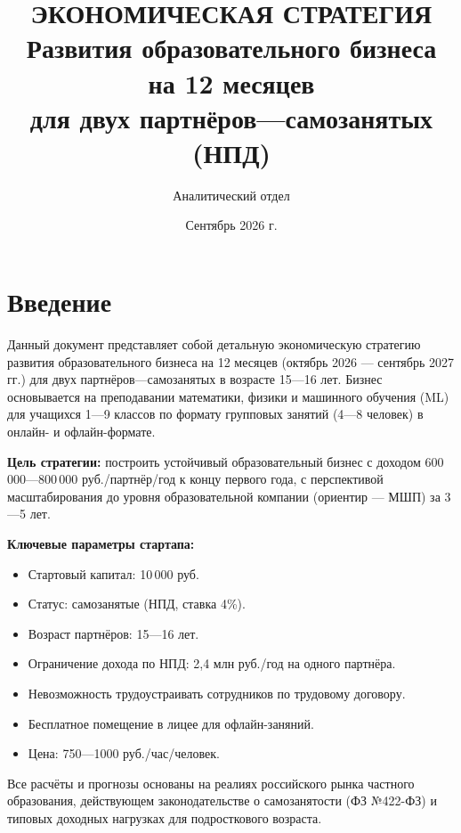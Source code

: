 \documentclass[12pt,a4paper]{article}
\title{
  \textbf{ЭКОНОМИЧЕСКАЯ СТРАТЕГИЯ} \\
  \vspace{0.3cm}
  \textbf{Развития образовательного бизнеса} \\
  \vspace{0.3cm}
  \textbf{на 12 месяцев} \\
  \vspace{0.3cm}
  \large
  для двух партнёров---самозанятых (НПД) \\
  \vspace{0.5cm}
}
\author{Аналитический отдел}
\date{Сентябрь 2026 г.}
\begin{document}
\maketitle

\newpage
\tableofcontents
\newpage

\section*{Введение}

Данный документ представляет собой детальную экономическую стратегию развития образовательного бизнеса на 12 месяцев (октябрь 2026 --- сентябрь 2027 гг.) для двух партнёров---самозанятых в возрасте 15---16 лет. Бизнес основывается на преподавании математики, физики и машинного обучения (ML) для учащихся 1---9 классов по формату групповых занятий (4---8 человек) в онлайн- и офлайн-формате.

\textbf{Цель стратегии:} построить устойчивый образовательный бизнес с доходом 600\,000---800\,000 руб./партнёр/год к концу первого года, с перспективой масштабирования до уровня образовательной компании (ориентир --- МШП) за 3---5 лет.

\textbf{Ключевые параметры стартапа:}

\begin{itemize}
  \item Стартовый капитал: 10\,000 руб.
  \item Статус: самозанятые (НПД, ставка 4\%).
  \item Возраст партнёров: 15---16 лет.
  \item Ограничение дохода по НПД: 2,4 млн руб./год на одного партнёра.
  \item Невозможность трудоустраивать сотрудников по трудовому договору.
  \item Бесплатное помещение в лицее для офлайн-заняний.
  \item Цена: 750---1000 руб./час/человек.
\end{itemize}

Все расчёты и прогнозы основаны на реалиях российского рынка частного образования, действующем законодательстве о самозанятости (ФЗ №422-ФЗ) и типовых доходных нагрузках для подросткового возраста.

\end{document}
